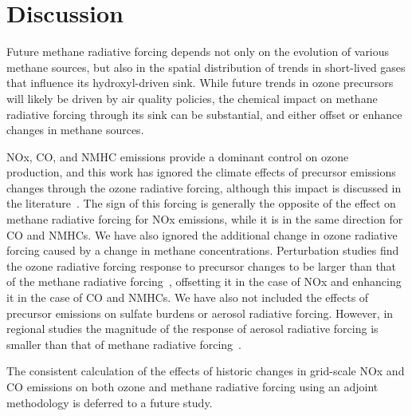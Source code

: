 \section{Discussion}

Future methane radiative forcing depends not only on the evolution of various methane sources, but also in the spatial distribution of trends in short-lived gases that influence its hydroxyl-driven sink. While future trends in ozone precursors will likely be driven by air quality policies, the chemical impact on methane radiative forcing through its sink can be substantial, and either offset or enhance changes in methane sources.

NOx, CO, and NMHC emissions provide a dominant control on ozone production, and this work has ignored the climate effects of precursor emissions changes through the ozone radiative forcing, although this impact is discussed in the literature~\citep{ref:naik2005,ref:bowman2012,ref:shindell2013}. The sign of this forcing is generally the opposite of the effect on methane radiative forcing for NOx emissions, while it is in the same direction for CO and NMHCs. We have also ignored the additional change in ozone radiative forcing caused by a change in methane concentrations. Perturbation studies find the ozone radiative forcing response to precursor changes to be larger than that of the methane radiative forcing~\citep{ref:akimoto2015}, offsetting it in the case of NOx and enhancing it in the case of CO and NMHCs. We have also not included the effects of precursor emissions on sulfate burdens or aerosol radiative forcing. However, in regional studies the magnitude of the response of aerosol radiative forcing is smaller than that of methane radiative forcing~\citep{ref:fry2012}.

The consistent calculation of the effects of historic changes in grid-scale NOx and CO emissions on both ozone and methane radiative forcing using an adjoint methodology is deferred to a future study.







